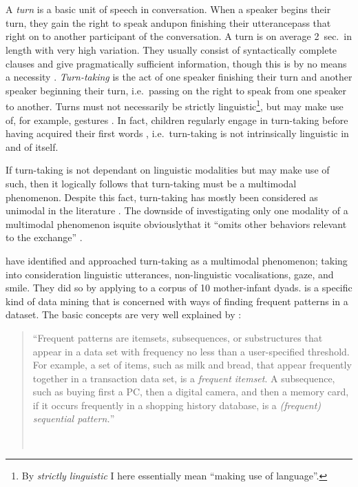 
\chapter{\introduction}
\label{ch:introduction}
A \emph{turn} is a basic unit of speech in conversation. When a speaker begins their turn, they gain the right to speak and\dash upon finishing their utterance\dash pass that right on to another participant of the conversation. A turn is on average 2~sec.\ in length with very high variation. They usually consist of syntactically complete clauses and give pragmatically sufficient information, though this is by no means a necessity \citep[]{levinson16}.
\emph{Turn-taking} is the act of one speaker finishing their turn and another speaker beginning their turn, i.e.\ passing on the right to speak from one speaker to another. Turns must not necessarily be strictly linguistic\footnote{By \emph{strictly linguistic} I here essentially mean ``making use of language''.}, but may make use of, for example, gestures \citep{missingsource}. In fact, children regularly engage in turn-taking before having acquired their first words \citep[]{casillas16}, i.e.\ turn-taking is not intrinsically linguistic in and of itself.

If turn-taking is not dependant on linguistic modalities but may make use of such, then it logically follows that turn-taking must be a multimodal phenomenon. Despite this fact, turn-taking has mostly been considered as unimodal in the literature \citep[]{rohlfing18}. The downside of investigating only one modality of a multimodal phenomenon is\dash quite obviously\dash that it ``omits other behaviors relevant to the exchange'' \citep[]{rohlfing18}.

\citet{rohlfing18} have identified and approached turn-taking as a multimodal phenomenon; taking into consideration linguistic utterances, non-linguistic vocalisations, gaze, and smile. They did so by applying \fpmlower to a corpus of 10 mother-infant dyads. \fpmsentence is a specific kind of data mining that is concerned with ways of finding frequent patterns in a dataset. The basic concepts are very well explained by \citet{han07}:

\begin{quote}
``Frequent patterns are itemsets, subsequences, or substructures that appear in a data set with frequency no less than a user-specified threshold. For example, a set of items, such as milk and bread, that appear frequently together in a transaction data set, is a \emph{frequent itemset}. A subsequence, such as buying first a PC, then a digital camera, and then a memory card, if it occurs frequently in a shopping history database, is a \emph{(frequent) sequential pattern.}''

~ \hfill \citep[, emphasis in original]{han07}
\end{quote}

